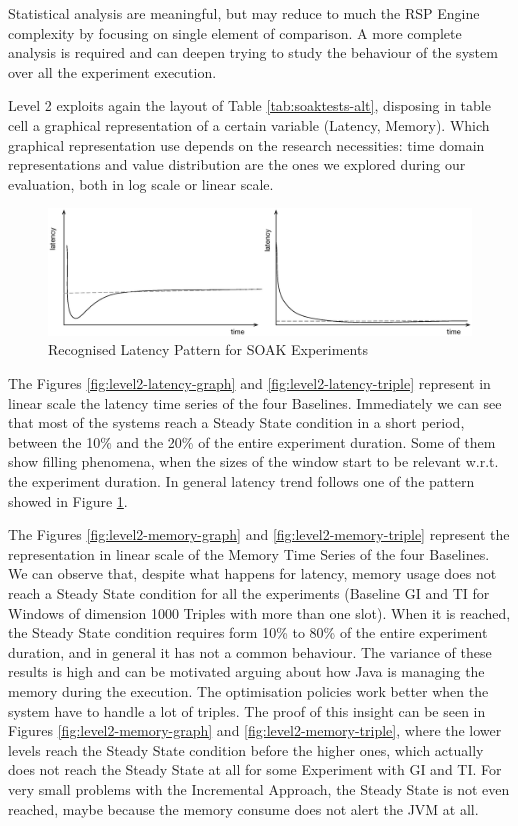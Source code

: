 Statistical analysis are meaningful, but may reduce to much the RSP Engine complexity by focusing on single element of comparison. A more complete analysis is required and \name can deepen trying to study the behaviour of the system over all the experiment execution.

Level 2 exploits again the layout of Table \ref{tab:soaktests-alt}, disposing in table cell a graphical representation of a certain variable (Latency, Memory). Which graphical representation use depends on the research necessities: time domain representations and value distribution are the ones we explored during our evaluation, both in log scale or linear scale.

\begin{figure}[hbt]
  \centering
	\includegraphics[width=\linewidth]{images/level2-pattern}
	\caption{Recognised Latency Pattern for SOAK Experiments} 
  	\label{fig:level2-pattern}
\end{figure}

The Figures \ref{fig:level2-latency-graph} and \ref{fig:level2-latency-triple} represent in linear scale the latency time series of the four Baselines. Immediately we can see that most of the systems reach a Steady State condition in a short period, between the 10\% and the 20\% of the entire experiment duration. Some of them show filling phenomena, when the sizes of the window start to be relevant w.r.t. the experiment duration. In general latency trend follows one of the pattern showed in Figure \ref{fig:level2-pattern}. %

The Figures \ref{fig:level2-memory-graph} and \ref{fig:level2-memory-triple} represent the  representation in linear scale of the Memory Time Series of the four Baselines. We can observe that, despite what happens for latency, memory usage does not reach a Steady State condition for all the experiments (Baseline GI and TI for Windows of dimension 1000 Triples with more than one slot).  When it is reached, the Steady State condition requires form 10\% to 80\% of the entire experiment duration, and in general it has not a common behaviour. The variance of these results is high and can be motivated arguing about how Java is managing the memory during the execution. The optimisation policies work better when the system have to handle a lot of triples. The proof of this insight can be seen in Figures \ref{fig:level2-memory-graph} and \ref{fig:level2-memory-triple}, where the lower levels reach the Steady State condition before the higher ones, which actually does not reach the Steady State at all for some Experiment with GI and TI.  For very small problems with the Incremental Approach, the Steady State is not even reached, maybe because the memory consume does not alert the JVM at all. 


